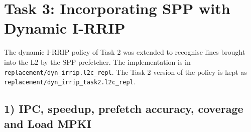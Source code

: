 \documentclass[10pt]{article}
\begin{document}
\section*{Task 3: Incorporating SPP with Dynamic I-RRIP}

The dynamic I-RRIP policy of Task 2 was extended to recognise lines brought into the L2 by the SPP prefetcher. The implementation is in \texttt{replacement/dyn\_irrip.l2c\_repl}. The Task 2 version of the policy is kept as 
\\
\texttt{replacement/dyn\_irrip\_task2.l2c\_repl}.

\subsection*{1) IPC, speedup, prefetch accuracy, coverage and Load MPKI}
\end{document}
